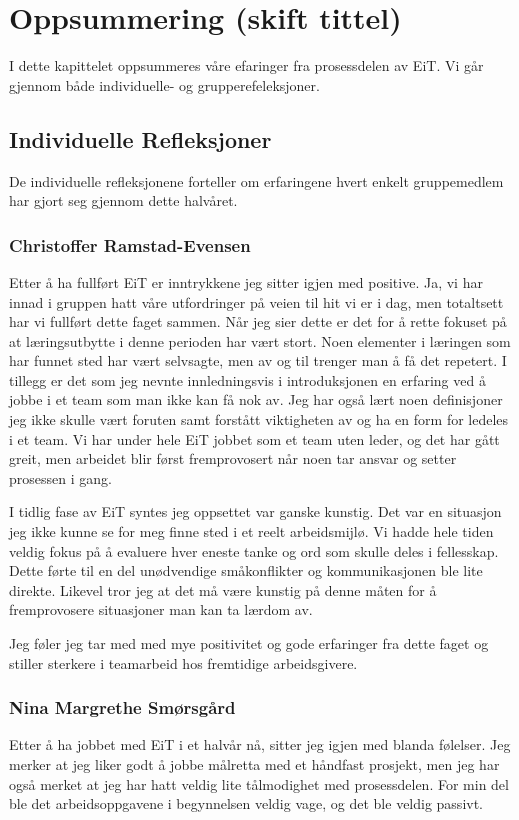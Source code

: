 \chapter{Oppsummering (skift tittel)}
I dette kapittelet oppsummeres våre efaringer fra prosessdelen av EiT.
Vi går gjennom både individuelle- og grupperefeleksjoner.

\section{Individuelle Refleksjoner}
De individuelle refleksjonene forteller om erfaringene hvert enkelt gruppemedlem
har gjort seg gjennom dette halvåret.

\subsection*{Christoffer Ramstad-Evensen}
Etter å ha fullført EiT er inntrykkene jeg sitter igjen med positive. Ja, vi har innad i gruppen hatt våre utfordringer
på veien til hit vi er i dag, men totaltsett har vi fullført dette faget sammen. Når jeg sier dette er det for å rette 
fokuset på at læringsutbytte i denne perioden har vært stort. Noen elementer i læringen som har funnet sted
har vært selvsagte, men av og til trenger man å få det repetert. I tillegg er det som jeg nevnte innledningsvis
i introduksjonen en erfaring ved å jobbe i et team som man ikke kan få nok av. Jeg har også lært noen 
definisjoner jeg ikke skulle vært foruten samt forstått viktigheten av og ha en form for ledeles i et team. 
Vi har under hele EiT jobbet som et team uten leder, og det har gått greit, men arbeidet blir først fremprovosert
når noen tar ansvar og setter prosessen i gang. 

I tidlig fase av EiT syntes jeg oppsettet var ganske kunstig. Det var en situasjon jeg ikke kunne se for meg
finne sted i et reelt arbeidsmijlø. Vi hadde hele tiden veldig fokus på å evaluere hver eneste tanke og ord som
skulle deles i fellesskap. Dette førte til en del unødvendige småkonflikter og kommunikasjonen ble lite direkte. 
Likevel tror jeg at det må være kunstig på denne måten for å fremprovosere situasjoner man kan ta lærdom av.

Jeg føler jeg tar med med mye positivitet og gode erfaringer fra dette faget og stiller sterkere i teamarbeid hos
fremtidige arbeidsgivere.

\subsection*{Nina Margrethe Smørsgård}
Etter å ha jobbet med EiT i et halvår nå, sitter jeg igjen med blanda følelser. 
Jeg merker at jeg liker godt å jobbe målretta med et håndfast prosjekt, men jeg 
har også merket at jeg har hatt veldig lite tålmodighet med prosessdelen. For 
min del ble det arbeidsoppgavene i begynnelsen veldig vage, og det ble veldig passivt.

